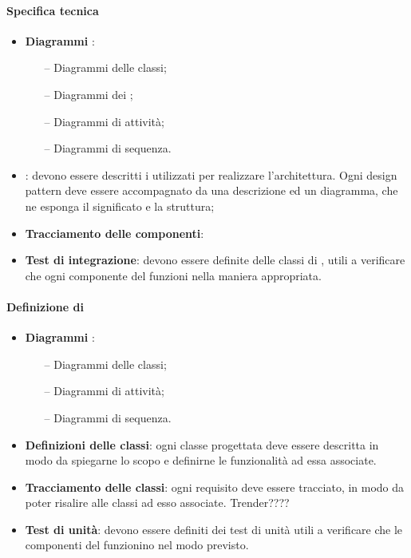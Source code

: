 \paragraph{Specifica tecnica}
\begin{itemize} 
	\item \textbf{Diagrammi }:
	\begin{itemize}
	\item[--] Diagrammi delle classi;
	\item[--] Diagrammi dei ;
	\item[--] Diagrammi di attività;
	\item[--] Diagrammi di sequenza.
	\end{itemize}
	\item \textbf{}: devono essere descritti i  utilizzati per realizzare l'architettura. Ogni design
pattern deve essere accompagnato da una descrizione ed un diagramma, che ne esponga il
significato e la struttura;
	\item \textbf{Tracciamento delle componenti}:
	\item \textbf{Test di integrazione}: devono essere definite delle classi di , utili a verificare che ogni componente del
 funzioni nella maniera appropriata.
\end{itemize}
 \paragraph{Definizione di }
\begin{itemize}
	\item \textbf{Diagrammi }:
	\begin{itemize}
		\item[--] Diagrammi delle classi;
		\item[--] Diagrammi di attività;
		\item[--] Diagrammi di sequenza.
	\end{itemize}
	\item \textbf{Definizioni delle classi}: ogni classe progettata deve essere descritta in modo da spiegarne lo scopo e definirne le
funzionalità ad essa associate.
	\item \textbf{Tracciamento delle classi}: ogni requisito deve essere tracciato, in modo da poter risalire alle classi ad esso associate. Trender????
	\item \textbf{Test di unità}: devono essere definiti dei test di unità utili a verificare che le componenti del 
funzionino nel modo previsto.
\end{itemize}

